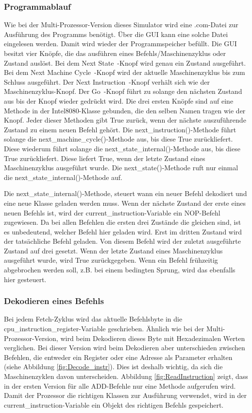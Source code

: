 \documentclass[12pt]{article}
\begin{document}
\subsubsection{Programmablauf}

Wie bei der Multi-Prozessor-Version dieses Simulator wird eine .com-Datei zur Ausführung des Programms benötigt. Über die GUI kann eine solche Datei eingelesen werden. Damit wird wieder der Programmspeicher befüllt.
Die GUI besitzt vier Knöpfe, die das ausführen eines Befehls/Maschinenzyklus oder Zustand auslöst. Bei dem \glqq Next State\grqq\ -Knopf wird genau ein Zustand ausgeführt. Bei dem \glqq Next Machine Cycle\grqq\ -Knopf wird der aktuelle Maschinenzyklus bis zum Schluss ausgeführt. Der  \glqq Next Instruction\grqq\ -Knopf verhält sich wie der Maschinenzyklus-Knopf. Der \glqq Go\grqq\ -Knopf führt zu solange den nächsten Zustand aus bis der Knopf wieder gedrückt wird. Die drei ersten Knöpfe sind auf eine Methode in der Intel8080-Klasse gebunden, die den selben Namen tragen wie der Knopf. Jeder dieser Methoden gibt True zurück, wenn der nächste auszuführende Zustand zu einem neuen Befehl gehört.
Die next\_instruction()-Methode führt solange die next\_machine\_cycle()-Methode aus, bis diese True zurückliefert. Diese wiederum führt solange die next\_state\_internal()-Methode aus, bis diese True zurückliefert. Diese liefert True, wenn der letzte Zustand eines Maschinenzyklus ausgeführt wurde. Die next\_state()-Methode ruft nur einmal die next\_state\_internal()-Methode auf.

\noindent
Die next\_state\_internal()-Methode, steuert wann ein neuer Befehl dekodiert und eine neue Klasse geladen werden muss. Wenn der nächste Zustand der erste eines neuen Befehls ist, wird der current\_instruction-Variable ein NOP-Befehl zugewiesen. Da bei allen Befehlen die ersten drei Zustände die gleichen sind, ist es unbedeutend, welcher Befehl hier geladen wird. Erst im dritten Zustand wird der tatsächliche Befehl geladen. Von diesem Befehl wird der zuletzt ausgeführte Zustand auf drei gesetzt. Wenn der letzte Zustand eines Maschinenzyklus ausgeführt wurde, wird True zurückgegeben. Wenn ein Befehl frühzeitig abgebrochen werden soll, z.B. bei einem bedingten Sprung, wird das ebenfalls hier gesteuert.

\subsubsection{Dekodieren eines Befehls}
Bei jedem Fetch-Zyklus wird das aktuelle Befehlsbyte in die cpu\_instruction\_register-Variable geschrieben. Ähnlich wie bei der Multi-Prozessor-Version, wird beim Dekodieren dieses Byte mit Hexadezimalen Werten verglichen. Bei dieser Version wird beim Dekodieren aber unterschieden zwischen Befehlen, die entweder ein Register oder eine Adresse als Parameter erhalten (siehe Abbildung \ref{fig:Decode_instr}). Dies ist deshalb wichtig, da sich die Maschinenzyklen davon unterscheiden. Abbildung \ref{fig:ReadInstruction}  zeigt, dass in der ersten Version für alle ADD-Befehle nur eine Methode aufgerufen wird. Damit der Prozessor die richtigen Klassen zur Ausführung verwendet, wird in der current\_instruction-Variable ein Objekt des richtigen Befehls gespeichert.
\end{document}
